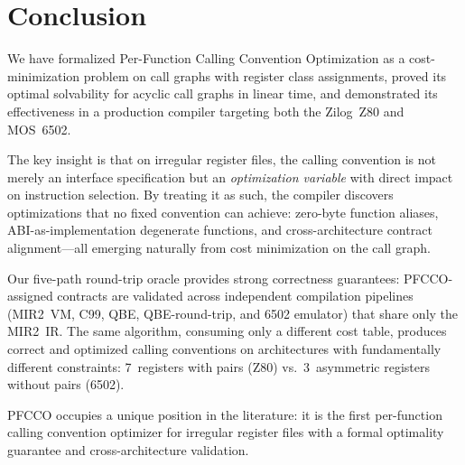 \documentclass[sigplan,screen,nonacm]{acmart}
\begin{document}
\section{Conclusion}
\label{sec:conclusion}

We have formalized Per-Function Calling Convention Optimization as a
cost-minimization problem on call graphs with register class assignments,
proved its optimal solvability for acyclic call graphs in linear time, and
demonstrated its effectiveness in a production compiler targeting both the
Zilog~Z80 and MOS~6502.

The key insight is that on irregular register files, the calling convention
is not merely an interface specification but an \emph{optimization variable}
with direct impact on instruction selection.  By treating it as such, the
compiler discovers optimizations that no fixed convention can achieve:
zero-byte function aliases, ABI-as-implementation degenerate functions,
and cross-architecture contract alignment---all emerging naturally from cost
minimization on the call graph.

Our five-path round-trip oracle provides strong correctness guarantees:
PFCCO-assigned contracts are validated across independent compilation
pipelines (MIR2~VM, C99, QBE, QBE-round-trip, and 6502 emulator) that
share only the MIR2~IR.  The same algorithm, consuming only a different
cost table, produces correct and optimized calling conventions on
architectures with fundamentally different constraints: 7~registers with
pairs (Z80) vs.\ 3~asymmetric registers without pairs (6502).

PFCCO occupies a unique position in the literature: it is the first
per-function calling convention optimizer for irregular register files
with a formal optimality guarantee and cross-architecture validation.


\end{document}
